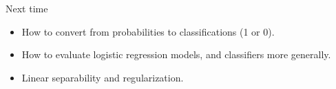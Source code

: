 \documentclass[aspectratio=169]{../latex_main/tntbeamer}  %
\begin{document}
	
	\begin{frame}[c]{Next time}
	    \begin{itemize}
	        \item How to convert from probabilities to classifications (1 or 0).
	        \item How to evaluate logistic regression models, and classifiers more generally.
	        \item Linear separability and regularization.
	    \end{itemize}
	\end{frame}
\end{document}

